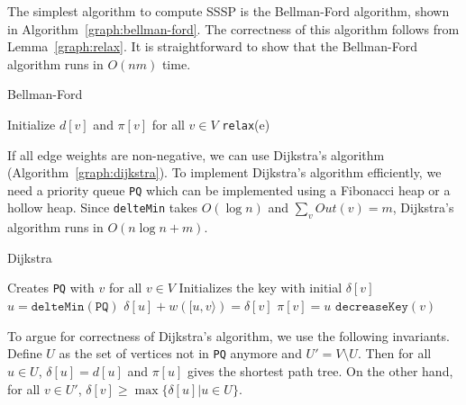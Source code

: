 The simplest algorithm to compute SSSP is the Bellman-Ford algorithm, shown in
Algorithm~\ref{graph:bellman-ford}.  The correctness of this algorithm follows
from Lemma~\ref{graph:relax}.  It is straightforward to show that the
Bellman-Ford algorithm runs in $O(nm)$ time.
\begin{algorithm}
  \caption{Bellman-Ford}\label{graph:bellman-ford}
  \begin{algorithmic}
      \State Initialize $d[v]$ and $\pi[v]$ for all $v\in V$
        \State \texttt{relax}(e)
        \EndFor
      \EndFor
    \EndFunction
  \end{algorithmic}
\end{algorithm}

If all edge weights are non-negative, we can use Dijkstra's algorithm
(Algorithm~\ref{graph:dijkstra}).  To implement Dijkstra's algorithm
efficiently, we need a priority queue \texttt{PQ} which can be implemented
using a Fibonacci heap or a hollow heap.  Since \texttt{delteMin} takes $O(\log
n)$ and $\sum_v Out(v)=m$, Dijkstra's algorithm runs in $O(n\log n+m)$.
\begin{algorithm}
  \caption{Dijkstra}\label{graph:dijkstra}
  \begin{algorithmic}
    \State Creates \texttt{PQ} with $v$ for all $v\in V$
    \State Initializes the key with initial $\delta[v]$
        \State $u=\texttt{delteMin}(\texttt{PQ})$
          \If{$\delta[u]+w([u,v\rangle)<\delta[v]$}
            \State $\delta[u]+w([u,v\rangle)=\delta[v]$
            \State $\pi[v]=u$
            \State $\texttt{decreaseKey}(v)$
          \EndIf
        \EndFor
      \EndWhile
    \EndFunction
  \end{algorithmic}
\end{algorithm}

To argue for correctness of Dijkstra's algorithm, we use the following
invariants.  Define $U$ as the set of vertices not in \texttt{PQ} anymore and
$U'=V\setminus U$.  Then for all $u\in U$, $\delta[u]=d[u]$ and $\pi[u]$ gives
the shortest path tree.  On the other hand, for all $v\in U'$,
$\delta[v]\geq\max\{\delta[u]|u\in U\}$.


